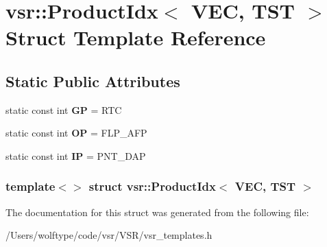 \hypertarget{structvsr_1_1_product_idx_3_01_v_e_c_00_01_t_s_t_01_4}{\section{vsr\-:\-:Product\-Idx$<$ V\-E\-C, T\-S\-T $>$ Struct Template Reference}
\label{structvsr_1_1_product_idx_3_01_v_e_c_00_01_t_s_t_01_4}
}
\subsection*{Static Public Attributes}
\begin{DoxyCompactItemize}
\item 
\hypertarget{structvsr_1_1_product_idx_3_01_v_e_c_00_01_t_s_t_01_4_a6d8f7f0778c6749425d085e037d55168}{static const int {\bfseries G\-P} = R\-T\-C}\label{structvsr_1_1_product_idx_3_01_v_e_c_00_01_t_s_t_01_4_a6d8f7f0778c6749425d085e037d55168}

\item 
\hypertarget{structvsr_1_1_product_idx_3_01_v_e_c_00_01_t_s_t_01_4_acd9c56c305da1f6e783ea9ad0e877c81}{static const int {\bfseries O\-P} = F\-L\-P\-\_\-\-A\-F\-P}\label{structvsr_1_1_product_idx_3_01_v_e_c_00_01_t_s_t_01_4_acd9c56c305da1f6e783ea9ad0e877c81}

\item 
\hypertarget{structvsr_1_1_product_idx_3_01_v_e_c_00_01_t_s_t_01_4_a8158c8741b8ca3efa23d3a12d8726670}{static const int {\bfseries I\-P} = P\-N\-T\-\_\-\-D\-A\-P}\label{structvsr_1_1_product_idx_3_01_v_e_c_00_01_t_s_t_01_4_a8158c8741b8ca3efa23d3a12d8726670}

\end{DoxyCompactItemize}
\subsubsection*{template$<$$>$ struct vsr\-::\-Product\-Idx$<$ V\-E\-C, T\-S\-T $>$}



The documentation for this struct was generated from the following file\-:\begin{DoxyCompactItemize}
\item 
/\-Users/wolftype/code/vsr/\-V\-S\-R/vsr\-\_\-templates.\-h\end{DoxyCompactItemize}

